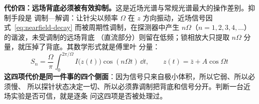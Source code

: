 \begin{principle}
\textbf{代价四：远场背底必须被有效抑制。}这是近场光谱与常规光谱最大的操作差别。抑制手段是
调制—解调：让针尖以频率 $\Omega$ 在 $z$ 方向振动，近场信号因式~\eqref{eq:nearfield-decay}
而被周期性调制，在探测器中产生 $n\Omega$（$n=1,2,3,4,\dots$）的谐波，未受调制的远场背底
（直流部分）则留在低频；锁相放大只提取 $n\Omega$ 分量，就压掉了背底。其数学形式就是傅里叶
分量：
\begin{equation}\label{eq:demod}
S_n=\frac{\Omega}{\pi}\int_{0}^{2\pi/\Omega} I\big(z(t)\big)\cos(n\Omega t)\,\dd t,
\qquad z(t)=\bar z+A\cos\Omega t
\end{equation}
\textbf{这四项代价是同一件事的四个侧面}：因为信号只来自极小体积，所以它弱、所以必须慢、
所以探针状态决定一切、所以必须靠调制把背底和信号分开。判断一台近场实验是否可信，就是逐条
问这四项是否被处理过。
\end{principle}

